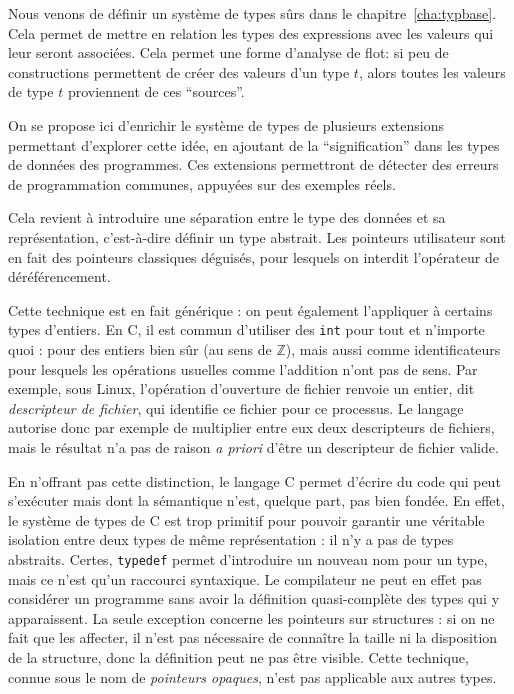 

Nous venons de définir un système de types sûrs dans le
chapitre~\ref{cha:typbase}. Cela permet de mettre en relation les types des
expressions avec les valeurs qui leur seront associées. Cela permet une forme
d'analyse de flot: si peu de constructions permettent de créer des valeurs d'un
type $t$, alors toutes les valeurs de type $t$ proviennent de ces
\enquote{sources}.

On se propose ici d'enrichir le système de types de plusieurs extensions
permettant d'explorer cette idée, en ajoutant de la \enquote{signification} dans
les types de données des programmes. Ces extensions permettront de détecter des
erreurs de programmation communes, appuyées sur des exemples réels.

Cela revient à introduire une séparation entre le type des données et sa
représentation, c'est-à-dire définir un type abstrait. Les pointeurs
utilisateur sont en fait des pointeurs classiques déguisés, pour lesquels on
interdit l'opérateur de déréférencement.

Cette technique est en fait générique : on peut également l'appliquer à certains
types d'entiers. En C, il est commun d'utiliser des \texttt{int} pour tout et
n'importe quoi : pour des entiers bien sûr (au sens de $ℤ$), mais aussi comme
identificateurs pour lesquels les opérations usuelles comme l'addition n'ont pas
de sens. Par exemple, sous Linux, l'opération d'ouverture de fichier renvoie un
entier, dit \emph{descripteur de fichier}, qui identifie ce fichier pour ce
processus.
Le langage autorise donc par exemple de multiplier entre
eux deux descripteurs de fichiers, mais le résultat n'a pas de raison \emph{a
priori} d'être un descripteur de fichier valide.

En n'offrant pas cette distinction, le langage C permet d'écrire du code qui
peut s'exécuter mais dont la sémantique n'est, quelque part, pas bien fondée. En
effet, le système de types de C est trop primitif pour pouvoir garantir une
véritable isolation entre deux types de même représentation : il n'y a pas de
types abstraits. Certes, \texttt{typedef} permet d'introduire un nouveau nom
pour un type, mais ce n'est qu'un raccourci syntaxique. Le compilateur ne peut
en effet pas considérer un programme sans avoir la définition quasi-complète des
types qui y apparaissent. La seule exception concerne les pointeurs sur
structures : si on ne fait que les affecter, il n'est pas nécessaire de
connaître la taille ni la disposition de la structure, donc la définition peut
ne pas être visible. Cette technique, connue sous le nom de \emph{pointeurs
opaques}, n'est pas applicable aux autres types.

